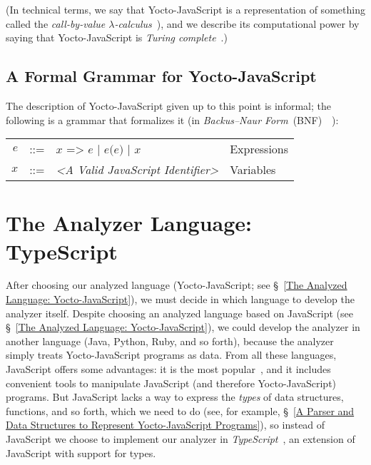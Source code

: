 \documentclass[12pt, oneside]{book}
\begin{document}
(In technical terms, we say that Yocto-JavaScript is a representation of something called the \emph{call-by-value $\lambda$-calculus}~\cite[§~6]{understanding-computation}), and we describe its computational power by saying that Yocto-JavaScript is \emph{Turing complete}~\cite[§~7]{understanding-computation}.)

\subsection{A Formal Grammar for Yocto-JavaScript}
\label{A Formal Grammar for Yocto-JavaScript}

The description of Yocto-JavaScript given up to this point is informal; the following is a grammar that formalizes it (in \emph{Backus–Naur Form}~(BNF)~\cite{bnf}~\cite[§~4.2]{dragon-book}):

\begin{center}
\begin{tabular}{rcll}
$e$ & ::= & $x\texttt{ => }e$ | $e\texttt{(}e\texttt{)}$ | $x$ & Expressions \\
$x$ & ::= & \emph{<A Valid JavaScript Identifier>} & Variables \\
\end{tabular}
\end{center}

\section{The Analyzer Language: TypeScript}
\label{The Analyzer Language: TypeScript}

After choosing our analyzed language (Yocto-JavaScript; see §~\ref{The Analyzed Language: Yocto-JavaScript}), we must decide in which language to develop the analyzer itself. Despite choosing an analyzed language based on JavaScript (see §~\ref{The Analyzed Language: Yocto-JavaScript}), we could develop the analyzer in another language (Java, Python, Ruby, and so forth), because the analyzer simply treats Yocto-JavaScript programs as data. From all these languages, JavaScript offers some advantages: it is the most popular~\cite{stack-overflow-developer-survey, jet-brains-developer-survey}, and it includes convenient tools to manipulate JavaScript (and therefore Yocto-JavaScript) programs. But JavaScript lacks a way to express the \emph{types} of data structures, functions, and so forth, which we need to do (see, for example, §~\ref{A Parser and Data Structures to Represent Yocto-JavaScript Programs}), so instead of JavaScript we choose to implement our analyzer in \emph{TypeScript}~\cite{typescript, typescript-deep-dive, understanding-typescript}, an extension of JavaScript with support for types.
\end{document}
